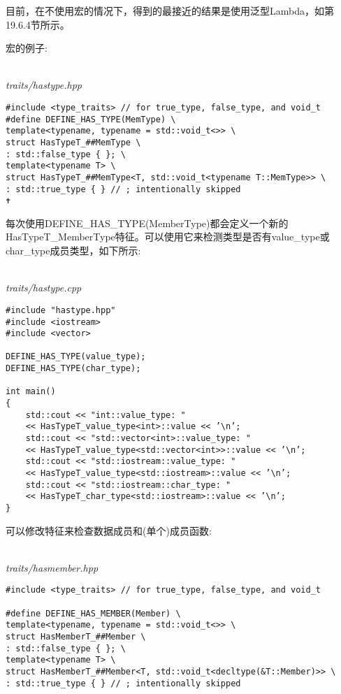 目前，在不使用宏的情况下，得到的最接近的结果是使用泛型Lambda，如第19.6.4节所示。

宏的例子:

\hspace*{\fill} \\ %
\noindent
\textit{traits/hastype.hpp}
\begin{lstlisting}[style=styleCXX]
#include <type_traits> // for true_type, false_type, and void_t
#define DEFINE_HAS_TYPE(MemType) \
template<typename, typename = std::void_t<>> \
struct HasTypeT_##MemType \
: std::false_type { }; \
template<typename T> \
struct HasTypeT_##MemType<T, std::void_t<typename T::MemType>> \
: std::true_type { } // ; intentionally skipped
✝ 
\end{lstlisting}

每次使用DEFINE\_HAS\_TYPE(MemberType)都会定义一个新的HasTypeT\_MemberType特征。可以使用它来检测类型是否有value\_type或char\_type成员类型，如下所示:

\hspace*{\fill} \\ %
\noindent
\textit{traits/hastype.cpp}
\begin{lstlisting}[style=styleCXX]
#include "hastype.hpp"
#include <iostream>
#include <vector>

DEFINE_HAS_TYPE(value_type);
DEFINE_HAS_TYPE(char_type);

int main()
{
	std::cout << "int::value_type: "
	<< HasTypeT_value_type<int>::value << ’\n’;
	std::cout << "std::vector<int>::value_type: "
	<< HasTypeT_value_type<std::vector<int>>::value << ’\n’;
	std::cout << "std::iostream::value_type: "
	<< HasTypeT_value_type<std::iostream>::value << ’\n’;
	std::cout << "std::iostream::char_type: "
	<< HasTypeT_char_type<std::iostream>::value << ’\n’;
}
\end{lstlisting}

\subsubsubsection{19.6.3\hspace{0.2cm}检测非类型成员}

可以修改特征来检查数据成员和(单个)成员函数:

\hspace*{\fill} \\ %
\noindent
\textit{traits/hasmember.hpp}
\begin{lstlisting}[style=styleCXX]
#include <type_traits> // for true_type, false_type, and void_t

#define DEFINE_HAS_MEMBER(Member) \
template<typename, typename = std::void_t<>> \
struct HasMemberT_##Member \
: std::false_type { }; \
template<typename T> \
struct HasMemberT_##Member<T, std::void_t<decltype(&T::Member)>> \
: std::true_type { } // ; intentionally skipped
\end{lstlisting}

